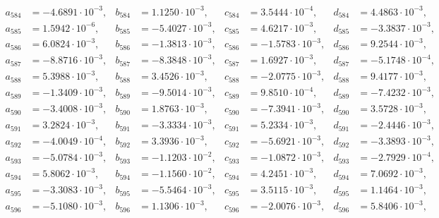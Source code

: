 \begin{align*}
  a_{ 584 } &= -4.6891 \cdot 10^{ -3 }, & b_{ 584 } &= 1.1250 \cdot 10^{ -3 }, & c_{ 584 } &= 3.5444 \cdot 10^{ -4 }, & d_{ 584 } &= 4.4863 \cdot 10^{ -3 }, \\ 
  a_{ 585 } &= 1.5942 \cdot 10^{ -6 }, & b_{ 585 } &= -5.4027 \cdot 10^{ -3 }, & c_{ 585 } &= 4.6217 \cdot 10^{ -3 }, & d_{ 585 } &= -3.3837 \cdot 10^{ -3 }, \\ 
  a_{ 586 } &= 6.0824 \cdot 10^{ -3 }, & b_{ 586 } &= -1.3813 \cdot 10^{ -3 }, & c_{ 586 } &= -1.5783 \cdot 10^{ -3 }, & d_{ 586 } &= 9.2544 \cdot 10^{ -3 }, \\ 
  a_{ 587 } &= -8.8716 \cdot 10^{ -3 }, & b_{ 587 } &= -8.3848 \cdot 10^{ -3 }, & c_{ 587 } &= 1.6927 \cdot 10^{ -3 }, & d_{ 587 } &= -5.1748 \cdot 10^{ -4 }, \\ 
  a_{ 588 } &= 5.3988 \cdot 10^{ -3 }, & b_{ 588 } &= 3.4526 \cdot 10^{ -3 }, & c_{ 588 } &= -2.0775 \cdot 10^{ -3 }, & d_{ 588 } &= 9.4177 \cdot 10^{ -3 }, \\ 
  a_{ 589 } &= -1.3409 \cdot 10^{ -3 }, & b_{ 589 } &= -9.5014 \cdot 10^{ -3 }, & c_{ 589 } &= 9.8510 \cdot 10^{ -4 }, & d_{ 589 } &= -7.4232 \cdot 10^{ -3 }, \\ 
  a_{ 590 } &= -3.4008 \cdot 10^{ -3 }, & b_{ 590 } &= 1.8763 \cdot 10^{ -3 }, & c_{ 590 } &= -7.3941 \cdot 10^{ -3 }, & d_{ 590 } &= 3.5728 \cdot 10^{ -3 }, \\ 
  a_{ 591 } &= 3.2824 \cdot 10^{ -3 }, & b_{ 591 } &= -3.3334 \cdot 10^{ -3 }, & c_{ 591 } &= 5.2334 \cdot 10^{ -3 }, & d_{ 591 } &= -2.4446 \cdot 10^{ -3 }, \\ 
  a_{ 592 } &= -4.0049 \cdot 10^{ -4 }, & b_{ 592 } &= 3.3936 \cdot 10^{ -3 }, & c_{ 592 } &= -5.6921 \cdot 10^{ -3 }, & d_{ 592 } &= -3.3893 \cdot 10^{ -3 }, \\ 
  a_{ 593 } &= -5.0784 \cdot 10^{ -3 }, & b_{ 593 } &= -1.1203 \cdot 10^{ -2 }, & c_{ 593 } &= -1.0872 \cdot 10^{ -3 }, & d_{ 593 } &= -2.7929 \cdot 10^{ -4 }, \\ 
  a_{ 594 } &= 5.8062 \cdot 10^{ -3 }, & b_{ 594 } &= -1.1560 \cdot 10^{ -2 }, & c_{ 594 } &= 4.2451 \cdot 10^{ -3 }, & d_{ 594 } &= 7.0692 \cdot 10^{ -3 }, \\ 
  a_{ 595 } &= -3.3083 \cdot 10^{ -3 }, & b_{ 595 } &= -5.5464 \cdot 10^{ -3 }, & c_{ 595 } &= 3.5115 \cdot 10^{ -3 }, & d_{ 595 } &= 1.1464 \cdot 10^{ -3 }, \\ 
  a_{ 596 } &= -5.1080 \cdot 10^{ -3 }, & b_{ 596 } &= 1.1306 \cdot 10^{ -3 }, & c_{ 596 } &= -2.0076 \cdot 10^{ -3 }, & d_{ 596 } &= 5.8406 \cdot 10^{ -3 }, \\ 

\end{align*}
